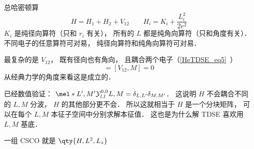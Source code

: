
总哈密顿算
\begin{equation}
H = H_1 + H_2 + V_{12} \qquad H_i = K_i + \frac{L_i^2}{2r^2}
\end{equation}
$K_i$ 是纯径向算符（只和 $r_i$ 有关）， 所有的 $L$ 都是纯角向算符（只和角度有关）． 不同电子的任意算符可对易， 纯径向算符和纯角向算符可对易．

最复杂的是 $V_{12}$， 既有径向也有角向， 且耦合两个电子（\autoref{HeTDSE_eq5}~）
\begin{equation}
[V_{12}, L^2] = [V_{12}, M] = 0
\end{equation}
从经典力学的角度来看这是成立的．

已经数值验证： $\mel*{L',M'}{\mathcal Y_{l,l}^{0,0}}{L,M} = \delta_{L,L'}\delta_{M,M'}$． 这说明 $H$ 不会耦合不同的 $L,M$ 分波， $H$ 的其他部分更不会． 所以这就相当于 $H$ 是一个分块矩阵， 可以在每个 $L,M$ 本征子空间中分别求解本征值． 这也是为什么解 TDSE 喜欢用 $L,M$ 基底．

一组 CSCO 就是 $\qty{H,L^2,L_z}$
